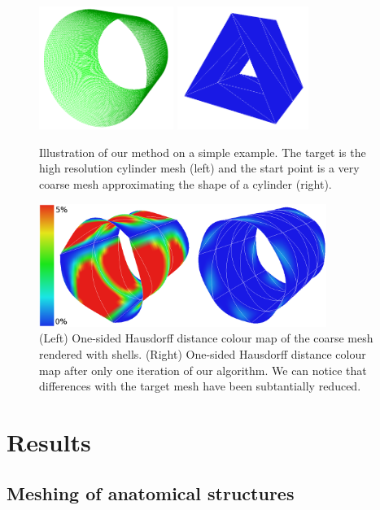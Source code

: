 \documentclass{llncs}
\begin{document}
\begin{figure}
\centering
\includegraphics[height=4cm]{images/cylinderHighWireframe}
\includegraphics[height=4cm]{images/cylinderLow}
\caption {Illustration of our method on a simple example. The target is the high resolution cylinder mesh (left) and the start point is a very coarse mesh approximating the shape of a cylinder (right).}
\label{fig-cylinder}
\end{figure}
\begin{figure}
\centering
\includegraphics[height=4cm]{images/resultsCylinder}
\caption {(Left) One-sided Hausdorff distance colour map of the coarse mesh rendered with shells. (Right) One-sided Hausdorff distance colour map after only one iteration of our algorithm. We can notice that differences with the target mesh have been subtantially reduced.}
\label{fig-cylinderResults}
\end{figure}

\section{Results}
\label{sec:results}
\subsection{Meshing of anatomical structures}
\end{document}
